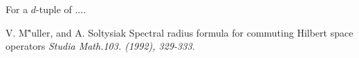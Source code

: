 \documentclass[xcolor=dvipsnames]{beamer}
\begin{document}
\begin{frame}{}
\begin{theorem}[\cite{MS92}]
For a $d$-tuple of ....
\end{theorem}

\beamertemplatearticlebibitems
\begin{thebibliography}{9}
\alert{V. M\""{u}ller, and A. Soltysiak}
\newblock Spectral radius formula for commuting Hilbert space operators
\newblock \em Studia Math.103. (1992), 329-333.
\end{thebibliography}

\end{frame}
\end{document}
